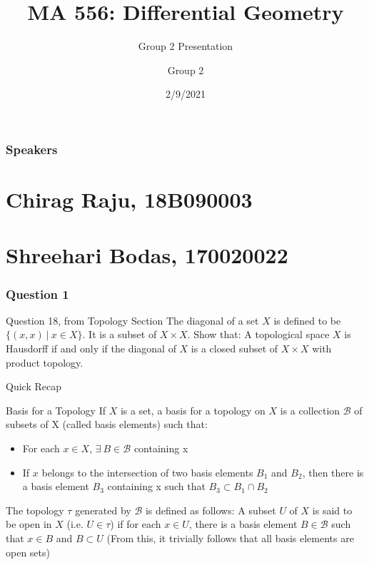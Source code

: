 \documentclass{beamer}
\title[MA 556 Presentation] %
{MA 556: Differential Geometry}
\subtitle{Group 2 Presentation}
\author[Group 2] %
{Group 2}
\institute[IIT-B] %
{
  Indian Institute of Technology, Bombay
}
\date[2/9/2021] %
{2/9/2021}
\begin{document}
\frame{\titlepage}


\begin{frame}
\frametitle{Speakers}
\tableofcontents[]
\end{frame}
\section{Chirag Raju, 18B090003}



\section{Shreehari Bodas, 170020022}
\begin{frame}
\frametitle{Question 1}
    \begin{block}{Question 18, from Topology Section}
    The diagonal of a set $X$ is defined to be $\{(x,x) \ | \ x \in X\}$. It is a subset of $X\times X$. Show that: A topological space $X$ is Hausdorff if and only if the diagonal of $X$ is a closed subset of $X\times X$ with product topology.
    \end{block}
\end{frame}

\begin{frame}{Quick Recap}
    \begin{block}{Basis for a Topology}
    If $X$ is a set, a basis for a topology on $X$ is a collection $\mathscr{B}$ of subsets of X (called basis elements) such that:
    \begin{itemize}
        \item For each $x \in X$, $\exists \ B \in \mathscr{B}$ containing x
        \item If $x$ belongs to the intersection of two basis elements $B_1$ and $B_2$, then there is a basis element $B_3$ containing x such that $B_3 \subset B_1 \cap B_2$
    \end{itemize}
    
    The topology $\tau$ generated by $\mathscr{B}$ is defined as follows:
    {\color{red}
    A subset $U$ of $X$ is said to be open in $X$ (i.e. $U \in \tau$) if for each $x \in U$, there is a basis element $B \in \mathscr{B}$ such that $x \in B$ and $B \subset U$} (From this, it trivially follows that all basis elements are open sets)
    \end{block}
\end{frame}
\end{document}
